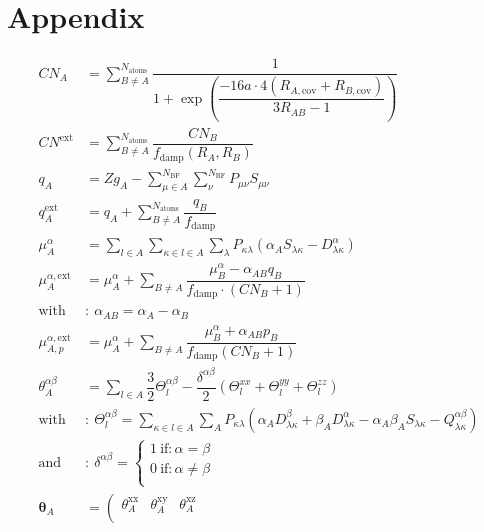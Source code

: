 \chapter{Appendix}

\begin{subequations}
    \label{eq:Feature}
\begin{align}
    CN_A &= \sum_{B \neq A}^{N_\mathrm{atoms}} \dfrac{1}{1+\exp\left(\dfrac{-16a\cdot 4 (R_{A,\mathrm{cov}}+R_{B,\mathrm{cov}})}{3R_{AB}-1}\right)} \\
    CN^\mathrm{ext} &= \sum_{B \neq A}^{N_\mathrm{atoms}} \dfrac{CN_B}{f_\mathrm{damp}(R_A,R_B)}\\
    q_A &= Zg_A - \sum_{\mu \in A}^{N_\mathrm{BF}}\sum_{\nu}^{N_\mathrm{BF}} P_{\mu \nu} S_{\mu \nu}\\
    q_A^\mathrm{ext} &= q_A + \sum_{B \neq A}^{N_\mathrm{atoms}} \dfrac{q_B}{f_\mathrm{damp}}\\
    \mu_A^\alpha &= \sum_{l\in A} \sum_{\kappa \in l \in A} \sum_{\lambda} P_{\kappa \lambda}\left(\alpha_A S_{\lambda \kappa} - D_{\lambda \kappa}^{\alpha}\right)\\
    \mu_A^{\alpha,\mathrm{ext}} &= \mu_A^{\alpha} + \sum_{B \neq A} \dfrac{\mu_B^\alpha - \alpha_{AB} q_B}{f_\mathrm{damp} \cdot (CN_B + 1)}\\
    \mathrm{with}&:~\alpha_{AB} = \alpha_A - \alpha_B\\
    \mu_{A,p}^{\alpha,\mathrm{ext}} &= \mu_A^\alpha + \sum_{B \neq A} \dfrac{\mu_B^\alpha+ \alpha_{AB} p_B}{f_\mathrm{damp} (CN_B+1)}\\
    \theta_A^{\alpha \beta} &=   \sum_{l \in A} \dfrac{3}{2}\Theta_l^{\alpha \beta} - \dfrac{\delta^{\alpha \beta}}{2} (\Theta^{xx}_l + \Theta^{yy}_l +\Theta^{zz}_l) \\
    \mathrm{with}&:~\Theta_l^{\alpha \beta} = \sum_{\kappa \in l \in A} \sum_A P_{\kappa \lambda} \left(\alpha_A D_{\lambda \kappa}^\beta +\beta_A D_{\lambda \kappa}^\alpha - \alpha_A \beta_A S_{\lambda \kappa } - Q_{\lambda \kappa}^{\alpha \beta}\right) \nonumber \\
    \mathrm{and}&:~\delta^{\alpha \beta}=\begin{cases}
     1~\mathrm{if}: \alpha = \beta \\
     0~\mathrm{if}: \alpha \neq \beta\\   
    \end{cases} \nonumber \\
    \bm{\uptheta}_A &= \left(\begin{matrix}
        \theta_A^{\mathrm{xx}} & \theta_A^{\mathrm{xy}} & \theta_A^{\mathrm{xz}} \\

\end{matrix}
\end{align}
\end{subequations}
